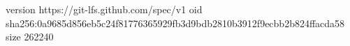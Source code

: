 version https://git-lfs.github.com/spec/v1
oid sha256:0a9685d856eb5c24f81776365929fb3d9bdb2810b3912f9ecbb2b824ffacda58
size 262240
